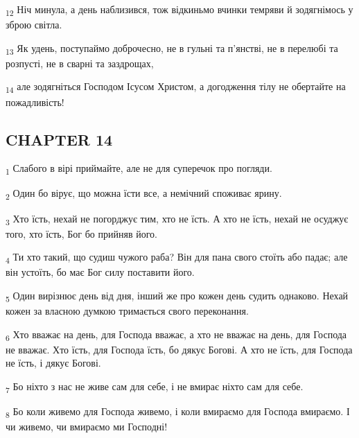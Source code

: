 \begin{tcolorbox}
\textsubscript{12} Ніч минула, а день наблизився, тож відкиньмо вчинки темряви й зодягнімось у зброю світла.
\end{tcolorbox}
\begin{tcolorbox}
\textsubscript{13} Як удень, поступаймо доброчесно, не в гульні та п'янстві, не в перелюбі та розпусті, не в сварні та заздрощах,
\end{tcolorbox}
\begin{tcolorbox}
\textsubscript{14} але зодягніться Господом Ісусом Христом, а догодження тілу не обертайте на пожадливість!
\end{tcolorbox}
\subsection{CHAPTER 14}
\begin{tcolorbox}
\textsubscript{1} Слабого в вірі приймайте, але не для суперечок про погляди.
\end{tcolorbox}
\begin{tcolorbox}
\textsubscript{2} Один бо вірує, що можна їсти все, а немічний споживає ярину.
\end{tcolorbox}
\begin{tcolorbox}
\textsubscript{3} Хто їсть, нехай не погорджує тим, хто не їсть. А хто не їсть, нехай не осуджує того, хто їсть, Бог бо прийняв його.
\end{tcolorbox}
\begin{tcolorbox}
\textsubscript{4} Ти хто такий, що судиш чужого раба? Він для пана свого стоїть або падає; але він устоїть, бо має Бог силу поставити його.
\end{tcolorbox}
\begin{tcolorbox}
\textsubscript{5} Один вирізнює день від дня, інший же про кожен день судить однаково. Нехай кожен за власною думкою тримається свого переконання.
\end{tcolorbox}
\begin{tcolorbox}
\textsubscript{6} Хто вважає на день, для Господа вважає, а хто не вважає на день, для Господа не вважає. Хто їсть, для Господа їсть, бо дякує Богові. А хто не їсть, для Господа не їсть, і дякує Богові.
\end{tcolorbox}
\begin{tcolorbox}
\textsubscript{7} Бо ніхто з нас не живе сам для себе, і не вмирає ніхто сам для себе.
\end{tcolorbox}
\begin{tcolorbox}
\textsubscript{8} Бо коли живемо для Господа живемо, і коли вмираємо для Господа вмираємо. І чи живемо, чи вмираємо ми Господні!
\end{tcolorbox}

